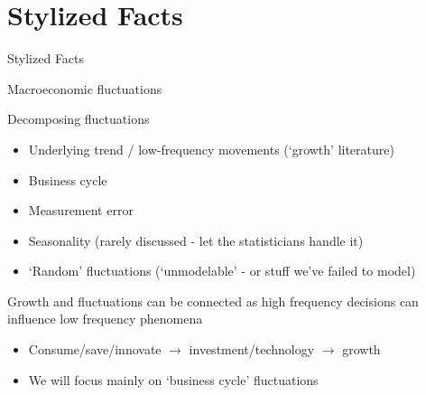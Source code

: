 \section{Stylized Facts}

\begin{frame}

\begin{center}
{\LARGE Stylized Facts}
\end{center}

\end{frame}


\begin{frame}{Macroeconomic fluctuations}

Decomposing fluctuations
	\begin{itemize}
	\item Underlying trend / low-frequency movements (`growth' literature)
	\item Business cycle
	\item Measurement error
	\item Seasonality (rarely discussed - let the statisticians handle it)
	\item `Random' fluctuations (`unmodelable' - or stuff we've failed to model)
	\end{itemize}
\vspace{3mm}
Growth and fluctuations can be connected as high frequency decisions can influence low frequency phenomena
	\begin{itemize}
	\item	Consume/save/innovate $\rightarrow$ investment/technology $\rightarrow$ growth
	\item	We will focus mainly on `business cycle' fluctuations
	\end{itemize}

\end{frame}



